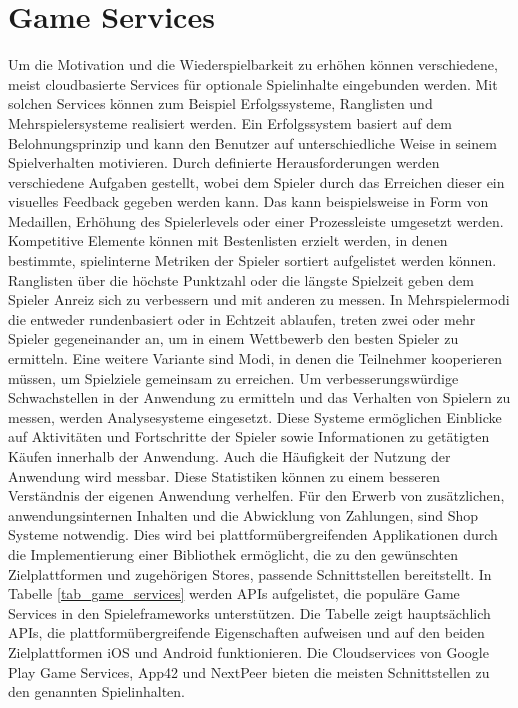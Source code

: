 \section{Game Services}
Um die Motivation und die Wiederspielbarkeit zu erhöhen können verschiedene, meist cloudbasierte Services für optionale Spielinhalte eingebunden werden. Mit solchen Services können zum Beispiel Erfolgssysteme, Ranglisten und Mehrspielersysteme realisiert werden.
Ein Erfolgssystem basiert auf dem Belohnungsprinzip und kann den Benutzer auf unterschiedliche Weise in seinem Spielverhalten motivieren. Durch definierte Herausforderungen werden verschiedene Aufgaben gestellt, wobei dem Spieler durch das Erreichen dieser ein visuelles Feedback gegeben werden kann. Das kann beispielsweise in Form von Medaillen, Erhöhung des Spielerlevels oder einer Prozessleiste umgesetzt werden. Kompetitive Elemente können mit Bestenlisten erzielt werden, in denen bestimmte, spielinterne Metriken der Spieler sortiert aufgelistet werden können. Ranglisten über die höchste Punktzahl oder die längste Spielzeit geben dem Spieler Anreiz sich zu verbessern und mit anderen zu messen. 
In Mehrspielermodi die entweder rundenbasiert oder in Echtzeit ablaufen, treten zwei oder mehr Spieler gegeneinander an, um in einem Wettbewerb den besten Spieler zu ermitteln. Eine weitere Variante sind Modi, in denen die Teilnehmer kooperieren müssen, um Spielziele gemeinsam zu erreichen.
Um verbesserungswürdige Schwachstellen in der Anwendung zu ermitteln und das Verhalten von Spielern zu messen, werden Analysesysteme eingesetzt. Diese Systeme ermöglichen Einblicke auf Aktivitäten und Fortschritte der Spieler sowie Informationen zu getätigten Käufen innerhalb der Anwendung. Auch die Häufigkeit der Nutzung der Anwendung wird messbar. Diese Statistiken können zu einem besseren Verständnis der eigenen Anwendung verhelfen.
Für den Erwerb von zusätzlichen, anwendungsinternen Inhalten und die Abwicklung von Zahlungen, sind Shop Systeme notwendig. Dies wird bei plattformübergreifenden Applikationen durch die Implementierung einer Bibliothek ermöglicht, die zu den gewünschten Zielplattformen und zugehörigen Stores, passende Schnittstellen bereitstellt. 
In Tabelle \ref{tab_game_services} werden APIs aufgelistet, die populäre Game Services in den Spieleframeworks unterstützen. Die Tabelle zeigt hauptsächlich APIs, die plattformübergreifende Eigenschaften aufweisen und auf den beiden Zielplattformen iOS und Android funktionieren. Die Cloudservices von Google Play Game Services, App42 und NextPeer bieten die meisten Schnittstellen zu den genannten Spielinhalten.

